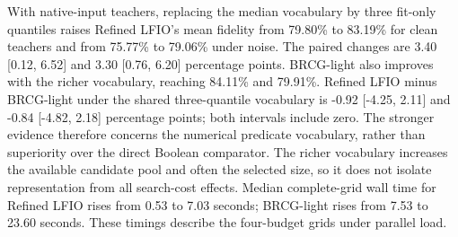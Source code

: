 With native-input teachers, replacing the median vocabulary by three fit-only quantiles raises Refined LFIO's mean fidelity from 79.80\% to 83.19\% for clean teachers and from 75.77\% to 79.06\% under noise. The paired changes are 3.40 [0.12, 6.52] and 3.30 [0.76, 6.20] percentage points. BRCG-light also improves with the richer vocabulary, reaching 84.11\% and 79.91\%. Refined LFIO minus BRCG-light under the shared three-quantile vocabulary is -0.92 [-4.25, 2.11] and -0.84 [-4.82, 2.18] percentage points; both intervals include zero. The stronger evidence therefore concerns the numerical predicate vocabulary, rather than superiority over the direct Boolean comparator. The richer vocabulary increases the available candidate pool and often the selected size, so it does not isolate representation from all search-cost effects. Median complete-grid wall time for Refined LFIO rises from 0.53 to 7.03 seconds; BRCG-light rises from 7.53 to 23.60 seconds. These timings describe the four-budget grids under parallel load.
